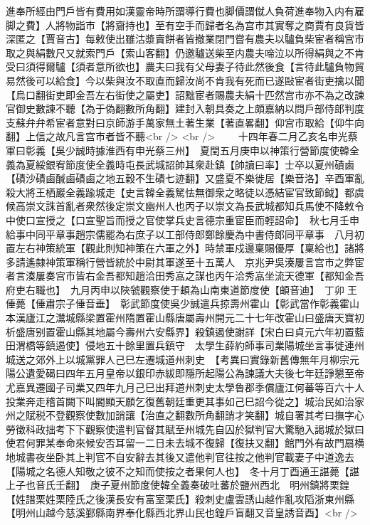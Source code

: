 進奉所經由門戶皆有費用如漢靈帝時所謂導行費也脚價謂僦人負荷進奉物入内有雇脚之費】人將物詣市【將齎持也】至有空手而歸者名為宫市其實奪之商賈有良貨皆深匿之【賈音古】每敕使出雖沽漿賣餅者皆撤業閉門嘗有農夫以驢負柴宦者稱宫市取之與絹數尺又就索門戶【索山客翻】仍邀驢送柴至内農夫啼泣以所得絹與之不肯受曰須得爾驢【須者意所欲也】農夫曰我有父母妻子待此然後食【言待此驢負物貿易然後可以給食】今以柴與汝不取直而歸汝尚不肯我有死而已遂敺宦者街吏擒以聞　【烏口翻街吏即金吾左右街使之屬吏】詔黜宦者賜農夫絹十匹然宫市亦不為之改諫官御史數諫不聽【為于偽翻數所角翻】建封入朝具奏之上頗嘉納以問戶部侍郎判度支蘇弁弁希宦者意對曰京師游手萬家無土著生業【著直畧翻】仰宫市取給【仰牛向翻】上信之故凡言宫市者皆不聽<br />
<br />
　　十四年春二月乙亥名申光蔡軍曰彰義【吳少誠時據淮西有申光蔡三州】　夏閏五月庚申以神策行營節度使韓全義為夏綏銀宥節度使全義時屯長武城詔帥其衆赴鎮【帥讀曰率】士卒以夏州磧鹵【磧沙磧鹵醎鹵磧鹵之地五穀不生磧七迹翻】又盛夏不樂徙居【樂音洛】辛酉軍亂殺大將王栖巖全義踰城走【史言韓全義駑怯無御衆之略徒以憑結宦官致節鉞】都虞候高崇文誅首亂者衆然後定崇文幽州人也丙子以崇文為長武城都知兵馬使不降敕令中使口宣授之【口宣聖旨而授之官使掌兵史言德宗重宦臣而輕詔命】　秋七月壬申給事中同平章事趙宗儒罷為右庶子以工部侍郎鄭餘慶為中書侍郎同平章事　八月初置左右神策統軍【觀此則知神策在六軍之外】時禁軍戍邊稟賜優厚【稟給也】諸將多請遙隸神策軍稱行營皆統於中尉其軍遂至十五萬人　京兆尹吳湊屢言宫市之弊宦者言湊屢奏宫市皆右金吾都知趙洽田秀嵓之謀也丙午洽秀嵓坐流天德軍【都知金吾府吏右職也】　九月丙申以陜虢觀察使于頔為山南東道節度使【頔音迪】　丁卯王倕薨【倕肅宗子倕音垂】　彰武節度使吳少誠遣兵掠壽州霍山【彰武當作彰義霍山本漢廬江之灊城縣梁置霍州隋置霍山縣唐屬壽州開元二十七年改霍山曰盛唐天寶初析盛唐别置霍山縣其地屬今壽州六安縣界】殺鎮遏使謝詳【宋白曰貞元六年初置藍田渭橋等鎮遏使】侵地五十餘里置兵鎮守　太學生薛約師事司業陽城坐言事徙連州城送之郊外上以城黨罪人己巳左遷城道州刺史　【考異曰實錄新舊傳無年月柳宗元陽公遺愛碣曰四年五月皇帝以銀印赤紱即隱所起陽公為諫議大夫後七年廷諍懇至帝尤嘉異遷國子司業又四年九月己巳出拜道州刺史太學魯郡季償廬江何蕃等百六十人投業奔走稽首闕下叫閽顯天願乞復舊朝廷重更其事如己巳詔今從之】城治民如治家州之賦税不登觀察使數加誚讓【治直之翻數所角翻誚才笑翻】城自署其考曰撫字心勞徵科政拙考下下觀察使遣判官督其賦至州城先自囚於獄判官大驚馳入謁城於獄曰使君何罪某奉命來候安否耳留一二日未去城不復歸【復扶又翻】館門外有故門扇横地城書夜坐卧其上判官不自安辭去其後又遣他判官往按之他判官載妻子中道逸去【陽城之名德人知敬之彼不之知而使按之者果何人也】　冬十月丁酉通王諶薨【諶上子也音氏壬翻】　庚子夏州節度使韓全義奏破吐蕃於鹽州西北　明州鎮將栗鍠【姓譜栗姓栗陸氏之後漢長安有富室栗氏】殺刺史盧雲誘山越作亂攻䧟浙東州縣【明州山越今慈溪鄞縣南界奉化縣西北界山民也鍠戶盲翻又音皇誘音酉】<br />
